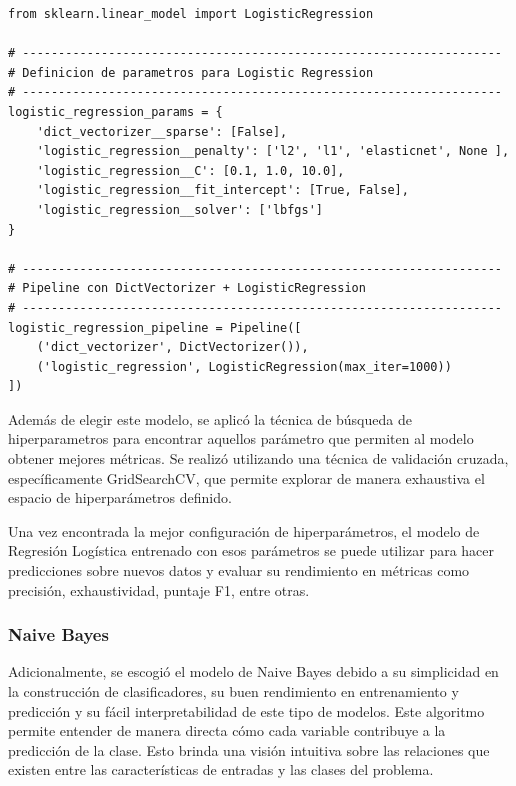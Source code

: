 \documentclass[11pt,a4paper,spanish]{book}
\numberwithin{equation}{chapter}
\numberwithin{figure}{chapter}
\begin{document}
\vspace{5mm}
\begin{lstlisting}
from sklearn.linear_model import LogisticRegression

# -------------------------------------------------------------------
# Definicion de parametros para Logistic Regression
# -------------------------------------------------------------------
logistic_regression_params = {
    'dict_vectorizer__sparse': [False],
    'logistic_regression__penalty': ['l2', 'l1', 'elasticnet', None ],
    'logistic_regression__C': [0.1, 1.0, 10.0],
    'logistic_regression__fit_intercept': [True, False],
    'logistic_regression__solver': ['lbfgs']
}

# -------------------------------------------------------------------
# Pipeline con DictVectorizer + LogisticRegression
# -------------------------------------------------------------------
logistic_regression_pipeline = Pipeline([
    ('dict_vectorizer', DictVectorizer()),
    ('logistic_regression', LogisticRegression(max_iter=1000))
])
\end{lstlisting}


Además de elegir este modelo, se aplicó la técnica de búsqueda de hiperparametros para encontrar aquellos parámetro que permiten al modelo obtener mejores métricas. Se realizó utilizando una técnica de validación cruzada, específicamente GridSearchCV, que permite explorar de manera exhaustiva el espacio de hiperparámetros definido.

Una vez encontrada la mejor configuración de hiperparámetros, el modelo de Regresión Logística entrenado con esos parámetros se puede utilizar para hacer predicciones sobre nuevos datos y evaluar su rendimiento en métricas como precisión, exhaustividad, puntaje F1, entre otras.


\subsubsection{Naive Bayes}

Adicionalmente, se escogió el modelo de Naive Bayes debido a su simplicidad en la construcción de clasificadores, su buen rendimiento en entrenamiento y predicción y su fácil interpretabilidad de este tipo de modelos. Este algoritmo permite entender de manera directa cómo cada variable contribuye a la predicción de la clase. Esto brinda una visión intuitiva sobre las relaciones que existen entre las características de entradas y las clases del problema.
\end{document}
